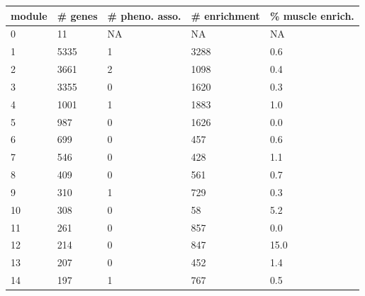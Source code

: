 \begin{table}[H]
\centering
\begin{tabular}{lllll}
\textbf{module} & \textbf{\# genes} & \textbf{\# pheno. asso.} & \textbf{\# enrichment} & \textbf{\% muscle enrich.} \\ \hline
0               & 11                & NA                       & NA                     & NA                         \\
1               & 5335              & 1                        & 3288                   & 0.6                        \\
2               & 3661              & 2                        & 1098                   & 0.4                        \\
3               & 3355              & 0                        & 1620                   & 0.3                        \\
4               & 1001              & 1                        & 1883                   & 1.0                        \\
5               & 987               & 0                        & 1626                   & 0.0                        \\
6               & 699               & 0                        & 457                    & 0.6                        \\
7               & 546               & 0                        & 428                    & 1.1                        \\
8               & 409               & 0                        & 561                    & 0.7                        \\
9               & 310               & 1                        & 729                    & 0.3                        \\
10              & 308               & 0                        & 58                     & 5.2                        \\
11              & 261               & 0                        & 857                    & 0.0                        \\
12              & 214               & 0                        & 847                    & 15.0                       \\
13              & 207               & 0                        & 452                    & 1.4                        \\
14              & 197               & 1                        & 767                    & 0.5                        \\

\end{tabular}
\end{table}

